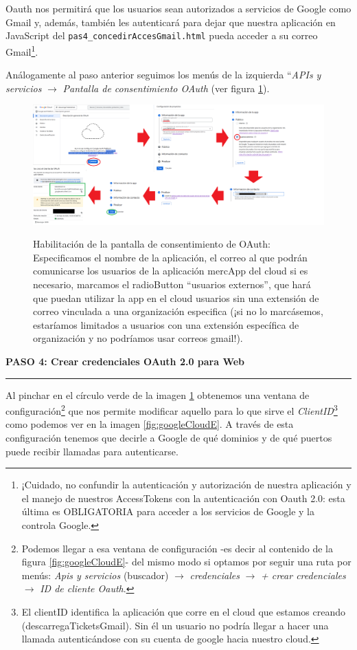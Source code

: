 \documentclass[a4paper,12pt]{report}
\begin{document}
	Oauth nos permitirá que los usuarios sean autorizados a servicios de Google como Gmail y, además, también les autenticará para dejar que nuestra aplicación en JavaScript del \texttt{pas4\_concedirAccesGmail.html} pueda acceder a su correo Gmail\footnote{¡Cuidado, no confundir la autenticación y autorización de nuestra aplicación y el manejo de nuestros AccessTokens con la autenticación con Oauth 2.0: esta última es OBLIGATORIA para acceder a los servicios de Google y la controla Google.}.
	
	Análogamente al paso anterior seguimos los menús de la izquierda ``\textit{APIs y servicios} $\rightarrow$ \textit{Pantalla de consentimiento OAuth} (ver figura \ref{fig:googleCloudD}).
	
	\FloatBarrier
	\setlength{\belowcaptionskip}{3pt}
	\begin{figure}[H]
		\centering
		\caption{Habilitación de la pantalla de consentimiento de OAuth: Especificamos el nombre de la aplicación, el correo al que podrán comunicarse los usuarios de la aplicación mercApp del cloud si es necesario, marcamos el radioButton ``usuarios externos'', que hará que puedan utilizar la app en el cloud usuarios sin una extensión de correo vinculada a una organización especifica (¡si no lo marcásemos, estaríamos limitados a usuarios con una extensión específica de organización y no podríamos usar correos gmail!).}
		\includegraphics[width=1\linewidth]{img/googleCloudD.png}
		\label{fig:googleCloudD}
	\end{figure}
	\FloatBarrier
	
	\noindent \textbf{PASO 4: Crear credenciales OAuth 2.0 para Web}
	\vspace{.1em}
	\hrule
	\vspace{.5em}
	
	Al pinchar en el círculo verde de la imagen \ref{fig:googleCloudD} obtenemos una ventana de configuración\footnote{Podemos llegar a esa ventana de configuración -es decir al contenido de la figura \ref{fig:googleCloudE}- del mismo modo si optamos por seguir una ruta por menús: \textit{Apis y servicios} (buscador) $\rightarrow$ \textit{credenciales} $\rightarrow$ \textit{+ crear credenciales} $\rightarrow$ \textit{ID de cliente Oauth}.} que nos permite modificar aquello para lo que sirve el \textit{ClientID}\footnote{El clientID identifica la aplicación que corre en el cloud que estamos creando (descarregaTicketsGmail). Sin él un usuario no podría llegar a hacer una llamada autenticándose con su cuenta de google hacia nuestro cloud.} como podemos ver en la imagen \ref{fig:googleCloudE}. A través de esta configuración tenemos que decirle a Google de qué dominios y de qué puertos puede recibir llamadas para autenticarse.
	
\end{document}
